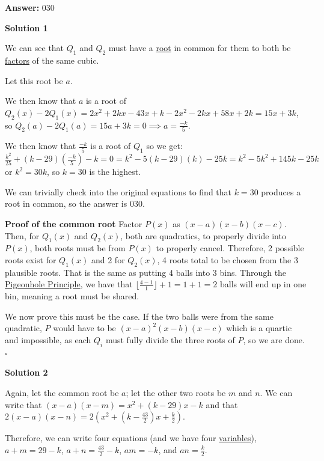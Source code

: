 \begin{enumerate}
 
 \textbf{Answer: }030



\textbf{Solution 1}

We can see that $Q_1$ and $Q_2$ must have a \href{https://artofproblemsolving.com/wiki/index.php?title=Root}{root} in common for them to both be \href{https://artofproblemsolving.com/wiki/index.php?title=Factor}{factors} of the same cubic.

 Let this root be $a$.

 We then know that $a$ is a root of$Q_{2}(x)-2Q_{1}(x) = 2x^{2}+2kx-43x+k-2x^{2}-2kx+58x+2k = 15x+3k$, so $Q_{2}(a)-2Q_1(a)=15a+3k=0\implies a = \frac{-k}{5}$.

 We then know that $\frac{-k}{5}$ is a root of $Q_{1}$ so we get:$\frac{k^{2}}{25}+(k-29)\left(\frac{-k}{5}\right)-k = 0 = k^{2}-5(k-29)(k)-25k = k^{2}-5k^{2}+145k-25k$or $k^{2}=30k$, so $k=30$ is the highest.

 We can trivially check into the original equations to find that $k=30$ produces a root in common, so the answer is $\boxed{030}$.

 \textbf{Proof of the common root} Factor $P(x)$ as $(x-a)(x-b)(x-c)$. Then, for $Q_1(x)$ and $Q_2(x)$, both are quadratics, to properly divide into $P(x)$, both roots must be from $P(x)$ to properly cancel. Therefore, 2 possible roots exist for $Q_1(x)$ and 2 for $Q_2(x)$, 4 roots total to be chosen from the 3 plausible roots. That is the same as putting 4 balls into 3 bins. Through the \href{https://artofproblemsolving.com/wiki/index.php?title=Pigeonhole\_Principle}{Pigeonhole Principle}, we have that $\lfloor \frac{4-1}{1} \rfloor + 1 = 1+1 = 2$ balls will end up in one bin, meaning a root must be shared. 

 We now prove this must be the case. If the two balls were from the same quadratic, $P$ would have to be $(x-a)^2(x-b)(x-c)$ which is a quartic and impossible, as each $Q_i$ must fully divide the three roots of $P$, so we are done. $\square$




\textbf{Solution 2}

Again, let the common root be $a$; let the other two roots be $m$ and $n$. We can write that $(x - a)(x - m) = x^2 + (k - 29)x - k$ and that $2(x - a)(x - n) = 2\left(x^2 + \left(k - \frac{43}{2}\right)x + \frac{k}{2}\right)$.

 Therefore, we can write four equations (and we have four \href{https://artofproblemsolving.com/wiki/index.php?title=Variable}{variables}), $a + m = 29 - k$, $a + n = \frac{43}{2} - k$, $am = -k$, and $an = \frac{k}{2}$. 


\end{enumerate}
